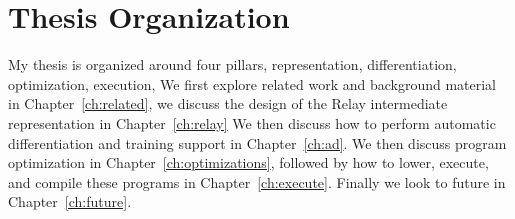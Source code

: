 \section{Thesis Organization}

My thesis is organized around four pillars, representation, differentiation, optimization, execution,
We first explore related work and background material in Chapter~\ref{ch:related},
  we discuss the design of the Relay intermediate representation in Chapter~\ref{ch:relay}
We then discuss how to perform automatic differentiation and training support in Chapter~\ref{ch:ad}.
We then discuss program optimization in Chapter~\ref{ch:optimizations},
  followed by how to lower, execute, and compile these programs in
  Chapter~\ref{ch:execute}.
Finally we look to future in Chapter~\ref{ch:future}.




